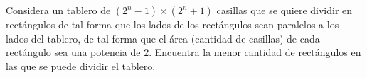 Considera un tablero de $(2^n - 1) \times (2^n + 1)$ casillas que se quiere dividir en rectángulos
de tal forma que los lados de los rectángulos sean paralelos a los lados del tablero, de
tal forma que el área (cantidad de casillas) de cada rectángulo sea una potencia de $2$.
Encuentra la menor cantidad de rectángulos en las que se puede dividir el tablero.